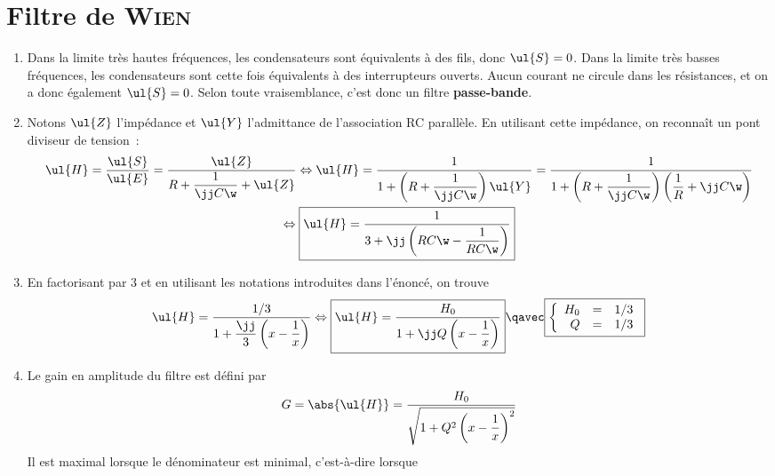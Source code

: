 \documentclass[a4paper, 12pt, final, garamond]{book}
\begin{document}
\section{Filtre de \textsc{Wien}}
\begin{enumerate}
    \item Dans la limite très hautes fréquences, les condensateurs sont
        équivalents à des fils, donc $\ul{S} = 0$. Dans la limite très basses
        fréquences, les condensateurs sont cette fois équivalents à des
        interrupteurs ouverts. Aucun courant ne circule dans les résistances, et
        on a donc également $\ul{S} = 0$. Selon toute vraisemblance, c'est donc
        un filtre \textbf{passe-bande}.
    \item Notons $\ul{Z}$ l'impédance et $\ul{Y}$ l'admittance de l'association
        RC parallèle. En utilisant cette impédance, on reconnaît un pont
        diviseur de tension~:
        \begin{gather*}
            \ul{H} = \frac{\ul{S}}{\ul{E}} = \frac{\ul{Z}}{R + \dfrac{1}{\jj
            C\w} + \ul{Z}}
            \Leftrightarrow
            \ul{H}
                = \frac{1}{1 + \left(R + \dfrac{1}{\jj C\w}\right)\ul{Y}}
                = \frac{1}{1 + \left(R + \dfrac{1}{\jj C\w}\right)\left(
                    \dfrac{1}{R} + \jj C\w\right)}\\
            \Leftrightarrow
            \boxed{\ul{H} = \frac{1}{3+\jj\left(RC\w - \dfrac{1}{RC\w}\right)}}
        \end{gather*}
    \item En factorisant par 3 et en utilisant les notations introduites dans
        l'énoncé, on trouve
        \begin{gather*}
            \ul{H}
                = \frac{1/3}{1 + \dfrac{\jj}{3} \left( x - \dfrac{1}{x} \right)}
            \Leftrightarrow
            \boxed{
            \ul{H} = \frac{H_0}{1 + \jj Q \left( x - \dfrac{1}{x} \right)}}
            \qavec
            \boxed{
            \left\{
                \begin{array}{rcl}
                    H_0 & = & 1/3\\
                    Q & = & 1/3
                \end{array}
            \right.
            }
        \end{gather*}
    \item Le gain en amplitude du filtre est défini par
        \[G = \abs{\ul{H}} = \frac{H_0}{\sqrt{1 + Q^2 \left( x - \dfrac{1}{x}
        \right)^2}}\]
        Il est maximal lorsque le dénominateur est minimal, c'est-à-dire lorsque

\end{enumerate}
\end{document}
